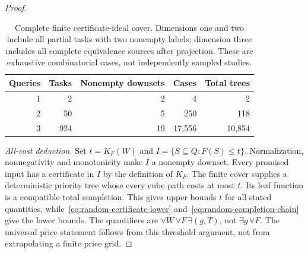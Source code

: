 \documentclass[pdflatex,sn-mathphys-num]{sn-jnl}
\theoremstyle{thmstyleone}
\theoremstyle{thmstylethree}
\theoremstyle{thmstyletwo}
\begin{document}
\begin{proof}
\begin{table}[ht]
\centering\small
\begin{tabular}{@{}rrrrr@{}}\toprule
Queries & Tasks & Nonempty downsets & Cases & Total trees\\\midrule
1 & 2 & 2 & 4 & 2\\
2 & 50 & 5 & 250 & 118\\
3 & 924 & 19 & 17,556 & 10,854\\\bottomrule
\end{tabular}
\caption{Complete finite certificate-ideal cover. Dimensions one and two include all partial tasks with two nonempty labels; dimension three includes all complete equivalence sources after projection. These are exhaustive combinatorial cases, not independently sampled studies.}\label{tab:small-ideal}
\end{table}

\emph{All-cost deduction.} Set $t=K_F(W)$ and $I=\{S\subseteq Q:F(S)\leq t\}$. Normalization, nonnegativity and monotonicity make $I$ a nonempty downset. Every promised input has a certificate in $I$ by the definition of $K_F$. The finite cover supplies a deterministic priority tree whose every cube path costs at most $t$. Its leaf function is a compatible total completion. This gives upper bounds $t$ for all stated quantities, while~\eqref{eq:random-certificate-lower} and~\eqref{eq:random-completion-chain} give the lower bounds. The quantifiers are $\forall W\,\forall F\,\exists(g,T)$, not $\exists g\,\forall F$. The universal price statement follows from this threshold argument, not from extrapolating a finite price grid.
\end{proof}
\end{document}
